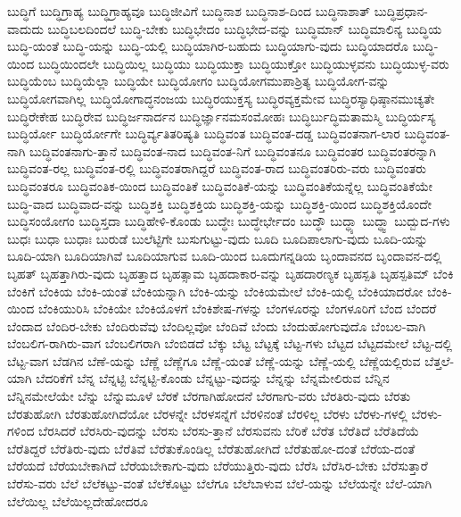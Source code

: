 {ಬುದ್ಧಿಗೆ
ಬುದ್ಧಿಗ್ರಾಹ್ಯ
ಬುದ್ಧಿಗ್ರಾಹ್ಯವೂ
ಬುದ್ಧಿಜೀವಿಗೆ
ಬುದ್ಧಿನಾಶ
ಬುದ್ಧಿನಾಶ-ದಿಂದ
ಬುದ್ಧಿನಾಶಾತ್
ಬುದ್ಧಿಪ್ರಧಾನ-ವಾದುದು
ಬುದ್ಧಿಬಲದಿಂದಲೆ
ಬುದ್ಧಿ-ಬೇಕು
ಬುದ್ಧಿಭೇದಂ
ಬುದ್ಧಿಭೇದ-ವನ್ನು
ಬುದ್ಧಿಮಾನ್
ಬುದ್ಧಿಮಾಲಿನ್ಯ
ಬುದ್ಧಿಯ
ಬುದ್ಧಿ-ಯಂತೆ
ಬುದ್ಧಿ-ಯನ್ನು
ಬುದ್ಧಿ-ಯಲ್ಲಿ
ಬುದ್ಧಿಯಾಗಿರ-ಬಹುದು
ಬುದ್ಧಿಯಾಗು-ವುದು
ಬುದ್ಧಿಯಾದರೊ
ಬುದ್ಧಿ-ಯಿಂದ
ಬುದ್ಧಿಯಿಂದಲೇ
ಬುದ್ಧಿಯಿಲ್ಲ
ಬುದ್ಧಿಯು
ಬುದ್ಧಿಯುಕ್ತಾ
ಬುದ್ಧಿಯುಕ್ತೋ
ಬುದ್ಧಿಯುಳ್ಳವನು
ಬುದ್ಧಿಯುಳ್ಳ-ವರು
ಬುದ್ಧಿಯೆಂಬ
ಬುದ್ಧಿಯೆಲ್ಲಾ
ಬುದ್ಧಿಯೇ
ಬುದ್ಧಿಯೋಗಂ
ಬುದ್ಧಿಯೋಗಮುಪಾಶ್ರಿತ್ಯ
ಬುದ್ಧಿಯೋಗ-ವನ್ನು
ಬುದ್ಧಿಯೋಗವಾಗಿಲ್ಲ
ಬುದ್ಧಿಯೋಗಾದ್ಧನಂಜಯ
ಬುದ್ಧಿರಯುಕ್ತಸ್ಯ
ಬುದ್ಧಿರವ್ಯಕ್ತಮೇವ
ಬುದ್ಧಿರಸ್ಯಾಧಿಷ್ಠಾನಮುಚ್ಯತೇ
ಬುದ್ಧಿರೇಕೇಹ
ಬುದ್ಧಿರೇವ
ಬುದ್ಧಿರ್ಜನಾರ್ದನ
ಬುದ್ಧಿರ್ಜ್ಞಾನಮಸಂಮೋಹಃ
ಬುದ್ಧಿರ್ಬುದ್ಧಿಮತಾಮಸ್ಮಿ
ಬುದ್ಧಿರ್ಯಸ್ಯ
ಬುದ್ಧಿರ್ಯೋ
ಬುದ್ಧಿರ್ಯೋಗೇ
ಬುದ್ಧಿರ್ವ್ಯತಿತರಿಷ್ಯತಿ
ಬುದ್ಧಿವಂತ
ಬುದ್ಧಿವಂತ-ದಡ್ಡ
ಬುದ್ಧಿವಂತನಾಗ-ಲಾರ
ಬುದ್ಧಿವಂತ-ನಾಗಿ
ಬುದ್ಧಿವಂತನಾಗು-ತ್ತಾನೆ
ಬುದ್ಧಿವಂತ-ನಾದ
ಬುದ್ಧಿವಂತ-ನಿಗೆ
ಬುದ್ಧಿವಂತನೂ
ಬುದ್ಧಿವಂತರ
ಬುದ್ಧಿವಂತರನ್ನಾಗಿ
ಬುದ್ಧಿವಂತ-ರಲ್ಲ
ಬುದ್ಧಿವಂತ-ರಲ್ಲಿ
ಬುದ್ಧಿವಂತರಾಗಿದ್ದರೆ
ಬುದ್ಧಿವಂತ-ರಾದ
ಬುದ್ಧಿವಂತರಿರು-ವರು
ಬುದ್ಧಿವಂತರು
ಬುದ್ಧಿವಂತರೂ
ಬುದ್ಧಿವಂತಿಕ-ಯಿಂದ
ಬುದ್ಧಿವಂತಿಕೆ
ಬುದ್ಧಿವಂತಿಕೆ-ಯನ್ನು
ಬುದ್ಧಿವಂತಿಕೆಯನ್ನೆಲ್ಲ
ಬುದ್ಧಿವಂತಿಕೆಯೇ
ಬುದ್ಧಿ-ವಾದ
ಬುದ್ಧಿವಾದ-ವನ್ನು
ಬುದ್ಧಿಶಕ್ತಿ
ಬುದ್ಧಿಶಕ್ತಿಯ
ಬುದ್ಧಿಶಕ್ತಿ-ಯನ್ನು
ಬುದ್ಧಿಶಕ್ತಿ-ಯಿಂದ
ಬುದ್ಧಿಶಕ್ತಿಯೊಂದೇ
ಬುದ್ಧಿಸಂಯೋಗಂ
ಬುದ್ಧಿಸ್ತದಾ
ಬುದ್ಧಿಹೇಳಿ-ಕೊಂಡು
ಬುದ್ಧೇಃ
ಬುದ್ಧೇರ್ಭೇದಂ
ಬುದ್ಧೌ
ಬುದ್ಧ್ಯಾ
ಬುದ್ಧ್ವಾ
ಬುದ್ಬುದ-ಗಳು
ಬುಧಃ
ಬುಧಾ
ಬುಧಾಃ
ಬುರುಡೆ
ಬುಲೆಟ್ಟಿಗೇ
ಬುಸುಗುಟ್ಟು-ವುದು
ಬೂದಿ
ಬೂದಿಪಾಲಾಗು-ವುದು
ಬೂದಿ-ಯನ್ನು
ಬೂದಿ-ಯಾಗಿ
ಬೂದಿಯಾಗಿವೆ
ಬೂದಿಯಾಗುವ
ಬೂದಿ-ಯಿಂದ
ಬೂದುಗನ್ನಡಿಯ
ಬೃಂದಾವನದ
ಬೃಂದಾವನ-ದಲ್ಲಿ
ಬೃಹತ್
ಬೃಹತ್ತಾಗಿರು-ವುದು
ಬೃಹತ್ತಾದ
ಬೃಹತ್ಸಾಮ
ಬೃಹದಾಕಾರ-ವನ್ನು
ಬೃಹದಾರಣ್ಯಕ
ಬೃಹಸ್ಪತಿ
ಬೃಹಸ್ಪತಿಮ್
ಬೆಂಕಿ
ಬೆಂಕಿಗೆ
ಬೆಂಕಿಯ
ಬೆಂಕಿ-ಯಂತೆ
ಬೆಂಕಿಯನ್ನಾಗಿ
ಬೆಂಕಿ-ಯನ್ನು
ಬೆಂಕಿಯಮೇಲೆ
ಬೆಂಕಿ-ಯಲ್ಲಿ
ಬೆಂಕಿಯಾದರೋ
ಬೆಂಕಿ-ಯಿಂದ
ಬೆಂಕಿಯುರಿಸಿ
ಬೆಂಕಿಯೇ
ಬೆಂಕಿಯೊಳಗೆ
ಬೆಂಕಿಶೇಷ-ಗಳನ್ನು
ಬೆಂಗಳೂರನ್ನು
ಬೆಂಗಳೂರಿಗೆ
ಬೆಂದ
ಬೆಂದರೆ
ಬೆಂದಾದ
ಬೆಂದಿರ-ಬೇಕು
ಬೆಂದಿರುವೆವು
ಬೆಂದಿಲ್ಲವೋ
ಬೆಂದಿವೆ
ಬೆಂದು
ಬೆಂದುಹೋಗುವುದೊ
ಬೆಂಬಲ-ವಾಗಿ
ಬೆಂಬಲಿಗ-ರಾಗಿರು-ವಾಗ
ಬೆಂಬಲಿಗರಾಗಿ
ಬೆಂಬಿಡದೆ
ಬೆಕ್ಕು
ಬೆಟ್ಟ
ಬೆಟ್ಟಕ್ಕೆ
ಬೆಟ್ಟ-ಗಳು
ಬೆಟ್ಟದ
ಬೆಟ್ಟದಮೇಲೆ
ಬೆಟ್ಟ-ದಲ್ಲಿ
ಬೆಟ್ಟ-ವಾಗ
ಬೆಡಗಿನ
ಬೆಣೆ-ಯನ್ನು
ಬೆಣ್ಣೆ
ಬೆಣ್ಣೆಗೂ
ಬೆಣ್ಣೆ-ಯಂತೆ
ಬೆಣ್ಣೆ-ಯನ್ನು
ಬೆಣ್ಣೆ-ಯಲ್ಲಿ
ಬೆಣ್ಣೆಯಲ್ಲಿರುವ
ಬೆತ್ತಲೆ-ಯಾಗಿ
ಬೆದರಿಕೆಗೆ
ಬೆನ್ನ
ಬೆನ್ನಟ್ಟಿ
ಬೆನ್ನಟ್ಟಿ-ಕೊಂಡು
ಬೆನ್ನಟ್ಟು-ವುದನ್ನು
ಬೆನ್ನನ್ನು
ಬೆನ್ನಮೇಲಿರುವ
ಬೆನ್ನಿನ
ಬೆನ್ನಿನಮೇಲೆಯೇ
ಬೆನ್ನು
ಬೆನ್ನುಮೂಳೆ
ಬೆರಕೆ
ಬೆರಗಾಗಿಹೋದನೆ
ಬೆರಗಾಗು-ವರು
ಬೆರತಿರು-ವುದು
ಬೆರತು
ಬೆರತುಹೋಗಿ
ಬೆರತುಹೋಗಿದೆಯೋ
ಬೆರಳನ್ನೇ
ಬೆರಳಸನ್ನೆಗೆ
ಬೆರಳಿನಂತೆ
ಬೆರಳಿಲ್ಲ
ಬೆರಳು
ಬೆರಳು-ಗಳಲ್ಲಿ
ಬೆರಳು-ಗಳಿಂದ
ಬೆರಸಿದರೆ
ಬೆರಸಿರು-ವುದನ್ನು
ಬೆರಸು
ಬೆರಸು-ತ್ತಾನೆ
ಬೆರಸುವನು
ಬೆರಿಕೆ
ಬೆರೆತ
ಬೆರೆತಿದೆ
ಬೆರೆತಿದೆಯೆ
ಬೆರೆತಿದ್ದರೆ
ಬೆರೆತಿರು-ವುದು
ಬೆರೆತಿವೆ
ಬೆರೆತುಕೊಂಡಿಲ್ಲ
ಬೆರೆತುಹೋಗಿದೆ
ಬೆರೆತುಹೋ-ದಂತೆ
ಬೆರೆಯ-ದಂತೆ
ಬೆರೆಯದೆ
ಬೆರೆಯಬೇಕಾಗಿದೆ
ಬೆರೆಯಬೇಕಾಗು-ವುದು
ಬೆರೆಯುತ್ತಿರು-ವುದು
ಬೆರೆಸಿ
ಬೆರೆಸಿರ-ಬೇಕು
ಬೆರೆಸುತ್ತಾರೆ
ಬೆರೆಸು-ವರು
ಬೆಲೆ
ಬೆಲೆಕಟ್ಟು-ವಂತೆ
ಬೆಲೆಕೊಟ್ಟು
ಬೆಲೆಗೂ
ಬೆಲೆಬಾಳುವ
ಬೆಲೆ-ಯನ್ನು
ಬೆಲೆಯನ್ನೇ
ಬೆಲೆ-ಯಾಗಿ
ಬೆಲೆಯಿಲ್ಲ
ಬೆಲೆಯಿಲ್ಲದೇಹೋದರೂ
}
